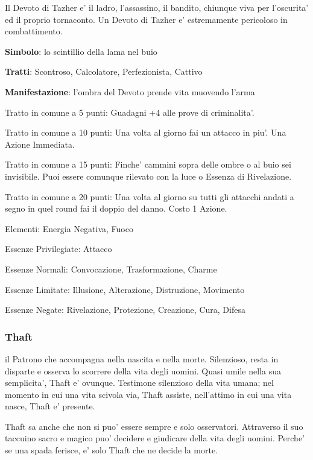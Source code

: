 \documentclass[a4paper,11pt,twoside,openany]{book}
\begin{document}
{Il Devoto di Tazher e' il ladro, l'assassino, il bandito, chiunque viva per l'oscurita' ed il proprio tornaconto. Un Devoto di Tazher e' estremamente pericoloso in combattimento.

\textbf{Simbolo}: lo scintillio della lama nel buio

\textbf{Tratti}: Scontroso, Calcolatore, Perfezionista, Cattivo

\textbf{Manifestazione}: l'ombra del Devoto prende vita muovendo l'arma

\bigskip

Tratto in comune a 5 punti: Guadagni +4 alle prove di criminalita'.

Tratto in comune a 10 punti: Una volta al giorno fai un attacco in piu'. Una Azione Immediata.

Tratto in comune a 15 punti: Finche' cammini sopra delle ombre o al buio sei invisibile. Puoi essere comunque rilevato con la luce o Essenza di Rivelazione.

Tratto in comune a 20 punti: Una volta al giorno su tutti gli attacchi andati a segno in quel round fai il doppio del danno. Costo 1 Azione.

\bigskip

Elementi: Energia Negativa, Fuoco

\bigskip

Essenze Privilegiate: Attacco

Essenze Normali: Convocazione, Trasformazione, Charme

Essenze Limitate: Illusione, Alterazione, Distruzione, Movimento

Essenze Negate: Rivelazione, Protezione, Creazione, Cura, Difesa

\subsubsection{Thaft}

\label{thaft}

il Patrono che accompagna nella nascita e nella morte. Silenzioso, resta in disparte e osserva lo scorrere della vita degli uomini. Quasi umile nella sua semplicita', Thaft e' ovunque. Testimone silenzioso della vita umana; nel momento in cui una vita scivola via, Thaft assiste, nell'attimo in cui una vita nasce, Thaft e' presente.

Thaft sa anche che non si puo' essere sempre e solo osservatori. Attraverso il suo taccuino sacro e magico puo' decidere e giudicare della vita degli uomini. Perche' se una spada ferisce, e' solo Thaft che ne decide la morte.

}
\end{document}
